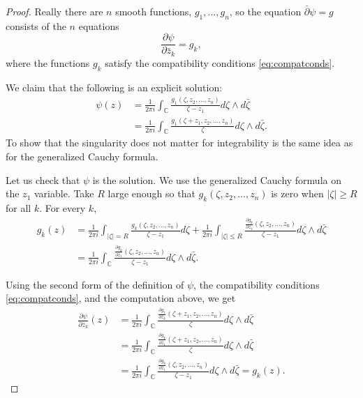 \documentclass[12pt,openany]{book}
\newcommand{\sabs}[1]{\lvert {#1} \rvert}
\newcommand{\abs}[1]{\left\lvert {#1} \right\rvert}
\newcommand{\C}{{\mathbb{C}}}
\theoremstyle{plain}
\theoremstyle{remark}
\theoremstyle{definition}
\theoremstyle{exercise}
\theoremstyle{example}
\begin{document}
\begin{proof}
Really there are $n$
smooth functions, $g_1,\ldots,g_n$, so the equation $\bar{\partial} \psi = g$
consists of the $n$ equations
\begin{equation*}
\frac{\partial \psi}{\partial \bar{z}_k} = g_k ,
\end{equation*}
where the functions $g_k$ satisfy the compatibility conditions
\eqref{eq:compatconds}.

We claim that the following is an explicit solution:
\begin{equation*}
\begin{split}
\psi(z)
& =
\frac{1}{2\pi i}
\int_\C
\frac{
 g_1(\zeta,z_2,\ldots,z_n)
}{\zeta - z_1}
d\zeta \wedge d\bar{\zeta}
\\
& =
\frac{1}{2\pi i}
\int_\C
\frac{
 g_1(\zeta+z_1,z_2,\ldots,z_n)
}{\zeta}
d\zeta \wedge d\bar{\zeta} .
\end{split}
\end{equation*}
To show that the singularity does not matter for integrability is the same
idea as for the generalized Cauchy formula.

Let us check that $\psi$ is the solution.
We use the generalized Cauchy formula on the $z_1$
variable.
Take $R$ large enough so that
$g_k(\zeta,z_2,\ldots,z_n)$ is zero when $\sabs{\zeta}\geq R$ for all $k$.
For every $k$,
\begin{equation*}
\begin{split}
g_k(z) & =
\frac{1}{2\pi i}
\int_{\abs{\zeta}=R}
\frac{g_k(\zeta,z_2,\ldots,z_n)}{\zeta-z_1}
d \zeta
+
\frac{1}{2\pi i}
\int_{\abs{\zeta} \leq R}
\frac{\frac{\partial g_k}{\partial \bar{z}_1}(\zeta,z_2,\ldots,z_n)}{\zeta-z_1}
d\zeta \wedge d\bar{\zeta}
\\
& =
\frac{1}{2\pi i}
\int_{\C}
\frac{\frac{\partial g_k}{\partial \bar{z}_1}(\zeta,z_2,\ldots,z_n)}{\zeta-z_1}
d\zeta \wedge d\bar{\zeta}  .
\end{split}
\end{equation*}

Using the second form of the definition of $\psi$, the
compatibility conditions \eqref{eq:compatconds}, and the computation above,
we get
\begin{equation*}
\begin{split}
\frac{\partial\psi}{\partial \bar{z}_k}(z)
& =
\frac{1}{2\pi i}
\int_\C
\frac{
 \frac{\partial g_1}{\partial \bar{z}_k}(\zeta+z_1,z_2,\ldots,z_n)
}{\zeta}
d\zeta \wedge d\bar{\zeta}
\\
& =
\frac{1}{2\pi i}
\int_\C
\frac{
 \frac{\partial g_k}{\partial \bar{z}_1}(\zeta+z_1,z_2,\ldots,z_n)
}{\zeta}
d\zeta \wedge d\bar{\zeta}
\\
& =
\frac{1}{2\pi i}
\int_\C
\frac{
 \frac{\partial g_k}{\partial \bar{z}_1}(\zeta,z_2,\ldots,z_n)
}{\zeta-z_1}
d\zeta \wedge d\bar{\zeta}
=
g_k(z) .
\end{split}
\end{equation*}


\end{proof}
\end{document}

